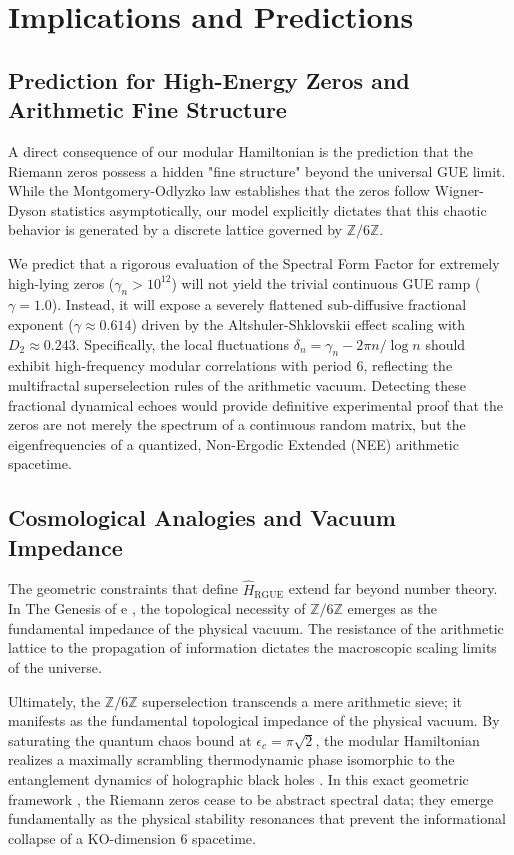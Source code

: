 \documentclass[aps,prl,preprint,superscriptaddress,floatfix]{revtex4-2}
\newcommand{\Zmod}{\mathbb{Z}/6\mathbb{Z}}
\begin{document}
\section{Implications and Predictions}

\subsection{Prediction for High-Energy Zeros and Arithmetic Fine Structure}

A direct consequence of our modular Hamiltonian is the prediction that the Riemann zeros possess a hidden "fine structure" beyond the universal GUE limit. While the Montgomery-Odlyzko law establishes that the zeros follow Wigner-Dyson statistics asymptotically, our model explicitly dictates that this chaotic behavior is generated by a discrete lattice governed by $\Zmod$.

We predict that a rigorous evaluation of the Spectral Form Factor for extremely high-lying zeros ($\gamma_n > 10^{12}$) will not yield the trivial continuous GUE ramp ($\gamma = 1.0$). Instead, it will expose a severely flattened sub-diffusive fractional exponent ($\gamma \approx 0.614$) driven by the Altshuler-Shklovskii effect scaling with $D_2 \approx 0.243$. Specifically, the local fluctuations $\delta_n = \gamma_n - 2\pi n/\log n$ should exhibit high-frequency modular correlations with period 6, reflecting the multifractal superselection rules of the arithmetic vacuum. Detecting these fractional dynamical echoes would provide definitive experimental proof that the zeros are not merely the spectrum of a continuous random matrix, but the eigenfrequencies of a quantized, Non-Ergodic Extended (NEE) arithmetic spacetime.

\subsection{Cosmological Analogies and Vacuum Impedance}

The geometric constraints that define $\hat{H}_{\text{RGUE}}$ extend far beyond number theory. In The Genesis of e \cite{PeinadorGenesis}, the topological necessity of $\Zmod$ emerges as the fundamental impedance of the physical vacuum. The resistance of the arithmetic lattice to the propagation of information dictates the macroscopic scaling limits of the universe.

Ultimately, the $\Zmod$ superselection transcends a mere arithmetic sieve; it manifests as the fundamental topological impedance of the physical vacuum. By saturating the quantum chaos bound at $\epsilon_c = \pi\sqrt{2}$, the modular Hamiltonian realizes a maximally scrambling thermodynamic phase isomorphic to the entanglement dynamics of holographic black holes \cite{Saad2019}. In this exact geometric framework \cite{ConnesConsani2021}, the Riemann zeros cease to be abstract spectral data; they emerge fundamentally as the physical stability resonances that prevent the informational collapse of a KO-dimension 6 spacetime.
\end{document}
